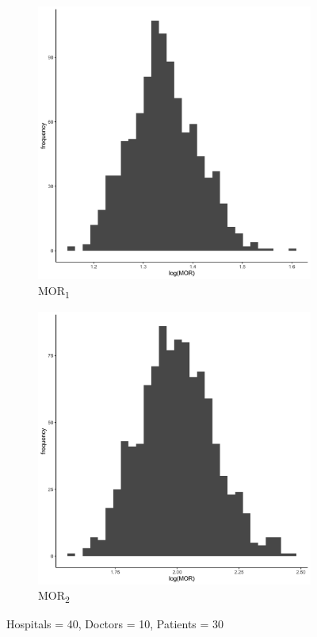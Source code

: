 \documentclass[
  letterpaper,
  DIV=11,
  numbers=noendperiod,
  titlepage]{scrartcl}
\begin{document}
\vspace{10mm}

\begin{figure}
\centering
\begin{subfigure}{.49\textwidth}
    \centering
    \includegraphics[width=.95\linewidth]{../../plots/three-lvl-ran-int/high-prev/hist_40_10_30_three_lvl_high_prev_mor1.png}  
    \caption{MOR\textsubscript{1}}
    \label{l40m10n301}
\end{subfigure}
\begin{subfigure}{.49\textwidth}
    \centering
    \includegraphics[width=.95\linewidth]{../../plots/three-lvl-ran-int/high-prev/hist_40_10_30_three_lvl_high_prev_mor2.png}
    \caption{MOR\textsubscript{2}}
    \label{l40m10n302}
\end{subfigure}
\caption{Hospitals = 40, Doctors = 10, Patients = 30}
\label{mor2}
\end{figure}
\end{document}
